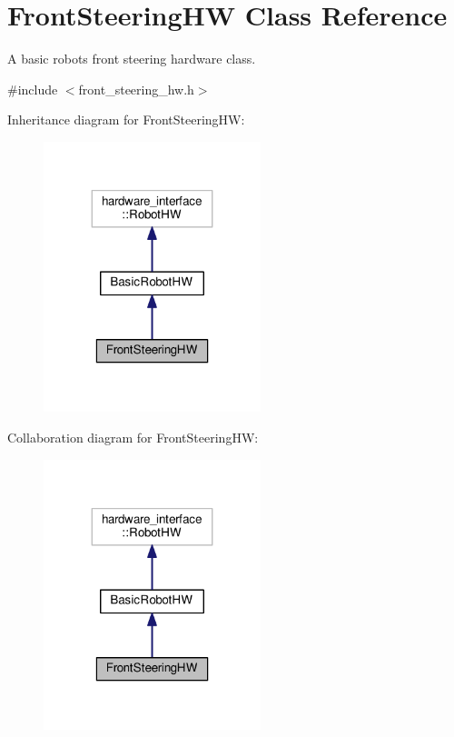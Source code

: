 \hypertarget{classFrontSteeringHW}{}\section{Front\+Steering\+HW Class Reference}
\label{classFrontSteeringHW}


A basic robot\textquotesingle{}s front steering hardware class.  




{\ttfamily \#include $<$front\+\_\+steering\+\_\+hw.\+h$>$}



Inheritance diagram for Front\+Steering\+HW\+:\nopagebreak
\begin{figure}[H]
\begin{center}
\leavevmode
\includegraphics[width=179pt]{classFrontSteeringHW__inherit__graph}
\end{center}
\end{figure}


Collaboration diagram for Front\+Steering\+HW\+:\nopagebreak
\begin{figure}[H]
\begin{center}
\leavevmode
\includegraphics[width=179pt]{classFrontSteeringHW__coll__graph}
\end{center}
\end{figure}
